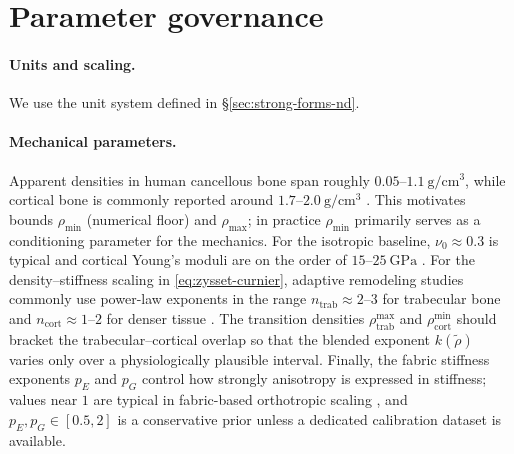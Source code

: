\section*{Parameter governance}
\label{sec:parameter-governance}

\paragraph{Units and scaling.}
We use the unit system defined in \S\ref{sec:strong-forms-nd}.

\paragraph{Mechanical parameters.}
Apparent densities in human cancellous bone span roughly $0.05$--$1.1~\mathrm{g/cm^3}$, while cortical bone is commonly reported around $1.7$--$2.0~\mathrm{g/cm^3}$ \cite{Helgason2008,Rho1993}.
This motivates bounds $\rho_{\min}$ (numerical floor) and $\rho_{\max}$; in practice $\rho_{\min}$ primarily serves as a conditioning parameter for the mechanics.
For the isotropic baseline, $\nu_0\approx 0.3$ is typical and cortical Young's moduli are on the order of $15$--$25~\mathrm{GPa}$ \cite{Rho1993}.
For the density--stiffness scaling in \eqref{eq:zysset-curnier}, adaptive remodeling studies commonly use power-law exponents in the range $n_{\mathrm{trab}}\approx 2$--$3$ for trabecular bone and $n_{\mathrm{cort}}\approx 1$--$2$ for denser tissue \cite{Weinans1992_BehaviorAdaptiveBoneRemodeling,Keller1994_PredictingCompressiveMechanicalBehavior,Helgason2008}.
The transition densities $\rho_{\mathrm{trab}}^{\max}$ and $\rho_{\mathrm{cort}}^{\min}$ should bracket the trabecular--cortical overlap so that the blended exponent $k(\widetilde{\rho})$ varies only over a physiologically plausible interval.
Finally, the fabric stiffness exponents $p_E$ and $p_G$ control how strongly anisotropy is expressed in stiffness; values near $1$ are typical in fabric-based orthotropic scaling \cite{Zysset1995_AlternativeModelAnisotropic}, and $p_E,p_G\in[0.5,2]$ is a conservative prior unless a dedicated calibration dataset is available.

